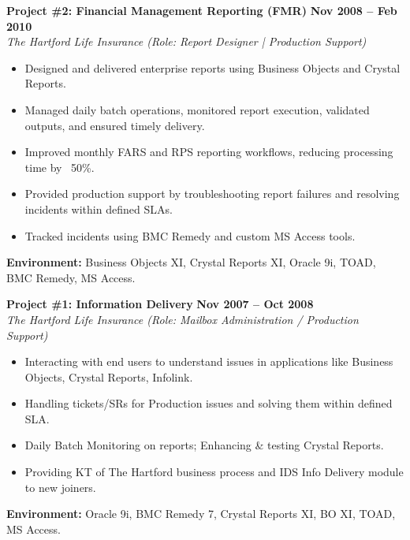 \documentclass[10pt,a4paper]{article}
\begin{document}
\noindent
\begin{minipage}{\textwidth}
    \textbf{\large Project \#2: Financial Management Reporting (FMR)} \hfill \textbf{Nov 2008 -- Feb 2010} \\
    \textit{The Hartford Life Insurance (Role: Report Designer | Production Support)}
    \begin{itemize}[leftmargin=*, noitemsep, topsep=2pt]
        \item Designed and delivered enterprise reports using Business Objects and Crystal Reports.
        \item Managed daily batch operations, monitored report execution, validated outputs, and ensured timely delivery.
        \item Improved monthly FARS and RPS reporting workflows, reducing processing time by ~50\%.
        \item Provided production support by troubleshooting report failures and resolving incidents within defined SLAs.
        \item Tracked incidents using BMC Remedy and custom MS Access tools.
    \end{itemize}
    \small{\textbf{Environment:} Business Objects XI, Crystal Reports XI, Oracle 9i, TOAD, BMC Remedy, MS Access.}
\end{minipage}
\vspace{10pt}

\noindent
\begin{minipage}{\textwidth}
    \textbf{\large Project \#1: Information Delivery} \hfill \textbf{Nov 2007 -- Oct 2008} \\
    \textit{The Hartford Life Insurance (Role: Mailbox Administration / Production Support)}
    \begin{itemize}[leftmargin=*, noitemsep, topsep=2pt]
        \item Interacting with end users to understand issues in applications like Business Objects, Crystal Reports, Infolink.
        \item Handling tickets/SRs for Production issues and solving them within defined SLA.
        \item Daily Batch Monitoring on reports; Enhancing \& testing Crystal Reports.
        \item Providing KT of The Hartford business process and IDS Info Delivery module to new joiners.
    \end{itemize}
    \small{\textbf{Environment:} Oracle 9i, BMC Remedy 7, Crystal Reports XI, BO XI, TOAD, MS Access.}
\end{minipage}
\end{document}
